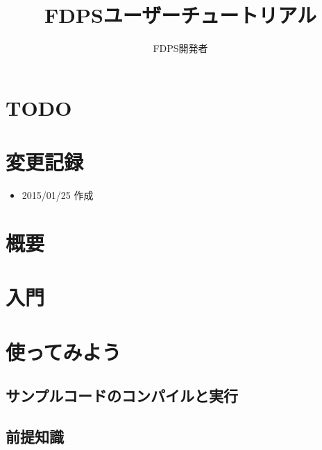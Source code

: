 \documentclass[12pt,a4paper]{jarticle}
\title{FDPSユーザーチュートリアル}
\author{FDPS開発者}
\date{}
\begin{document}
\maketitle
\tableofcontents

\newpage

\section{TODO}

\newpage

\section{変更記録}

\begin{itemize}
\item 2015/01/25 作成
\end{itemize}

\newpage

\section{概要}



\newpage

\section{入門}



\newpage

\section{使ってみよう}

\subsection{サンプルコードのコンパイルと実行}

\subsection{前提知識}
\end{document}
